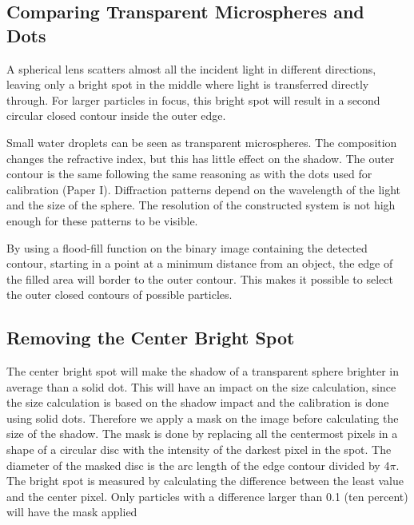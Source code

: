 \subsection{Comparing Transparent Microspheres and Dots}

A spherical lens scatters almost all the incident light in different directions, leaving only a bright spot in the middle where light is transferred directly through. For larger particles in focus, this bright spot will result in a second circular closed contour inside the outer edge. 

Small water droplets can be seen as transparent microspheres. The composition changes the refractive index, but this has little effect on the shadow. The outer contour is the same following the same reasoning as with the dots used for calibration \cite{ryd2015}(Paper I). Diffraction patterns depend on the wavelength of the light and the size of the sphere. The resolution of the constructed system is not high enough for these patterns to be visible.

By using a flood-fill function on the binary image containing the detected contour, starting in a point at a minimum distance from an object, the edge of the filled area will border to the outer contour. This makes it possible to select the outer closed contours of possible particles.

\subsection{Removing the Center Bright Spot}

The center bright spot will make the shadow of a transparent sphere brighter in average than a solid dot. This will have an impact on the size calculation, since the size calculation is based on the shadow impact and the calibration is done using solid dots. Therefore we apply a mask on the image before calculating the size of the shadow. The mask is done by replacing all the centermost pixels in a shape of a circular disc with the intensity of the darkest pixel in the spot. The diameter of the masked disc is the arc length of the edge contour divided by 4$\pi$. The bright spot is measured by calculating the difference between the least value and the center pixel. Only particles with a difference larger than 0.1 (ten percent) will have the mask applied

